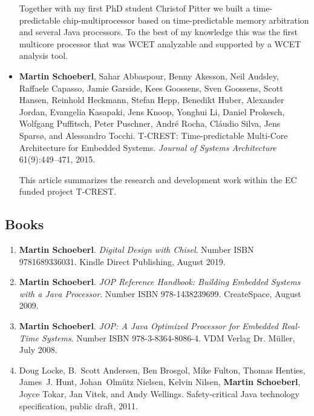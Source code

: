 \documentclass[%
    a4paper,
    11pt, %
    headinclude, footexclude,
    notitlepage,
    headsepline,
    pointlessnumbers,
    ]{scrartcl}
\begin{document}
\begin{itemize}
Together with my first PhD student Christof Pitter we built a time-predictable
chip-multiprocessor based on time-predictable memory arbitration and
several Java processors. To the best of my knowledge this was the first multicore
processor that was WCET analyzable and supported by a WCET analysis
tool.

\item {\bf Martin Schoeberl}, Sahar Abbaspour, Benny Akesson, Neil Audsley, Raffaele Capasso, Jamie Garside, Kees Goossens, Sven Goossens, Scott Hansen, Reinhold Heckmann, Stefan Hepp, Benedikt Huber, Alexander Jordan, Evangelia Kasapaki, Jens Knoop, Yonghui Li, Daniel Prokesch, Wolfgang Puffitsch, Peter Puschner, Andr\'{e} Rocha, Cl\'{a}udio Silva, Jens Spars{\o}, and Alessandro Tocchi.
 T-CREST: Time-predictable Multi-Core Architecture for Embedded Systems.
 \emph{Journal of Systems Architecture} 61(9):449--471, 2015.
 
 
This article summarizes the research and development work within the EC funded
project T-CREST.
 
\end{itemize}

\subsection*{Books}

\begin{enumerate}

\item {\bf Martin Schoeberl}. {\em Digital Design with Chisel}.
Number ISBN 9781689336031. Kindle Direct Publishing, August 2019. 

\item {\bf Martin Schoeberl}. {\em JOP Reference Handbook: Building
    Embedded Systems with a Java Processor}. Number ISBN
978-1438239699. CreateSpace, August 2009.

\item {\bf Martin Schoeberl}. {\em JOP: A Java Optimized Processor for
    Embedded Real-Time Systems}. Number ISBN 978-3-8364-8086-4.
    VDM Verlag Dr. M{\"u}ller, July 2008.

\item Doug Locke, B.~Scott Andersen, Ben Brosgol, Mike Fulton, Thomas Henties,
  James~J. Hunt, Johan~Olm\"{u}tz Nielsen, Kelvin Nilsen, {\bf Martin Schoeberl},
  Joyce Tokar, Jan Vitek, and Andy Wellings.
 Safety-critical {Java} technology specification, public draft, 2011.

\end{enumerate}
\end{document}
